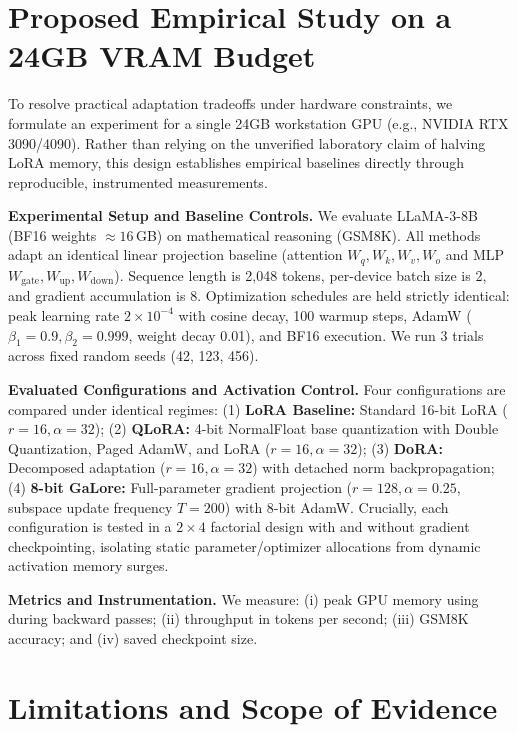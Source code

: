 \documentclass[11pt,a4paper]{article}
\begin{document}
\section{Proposed Empirical Study on a 24GB VRAM Budget}

To resolve practical adaptation tradeoffs under hardware constraints, we formulate an experiment for a single 24GB workstation GPU (e.g., NVIDIA RTX 3090/4090). Rather than relying on the unverified laboratory claim of halving LoRA memory, this design establishes empirical baselines directly through reproducible, instrumented measurements.

\textbf{Experimental Setup and Baseline Controls.} We evaluate LLaMA-3-8B (BF16 weights $\approx 16$\,GB) on mathematical reasoning (GSM8K). All methods adapt an identical linear projection baseline (attention $W_q, W_k, W_v, W_o$ and MLP $W_{\text{gate}}, W_{\text{up}}, W_{\text{down}}$). Sequence length is 2,048 tokens, per-device batch size is 2, and gradient accumulation is 8. Optimization schedules are held strictly identical: peak learning rate $2 \times 10^{-4}$ with cosine decay, 100 warmup steps, AdamW ($\beta_1=0.9, \beta_2=0.999$, weight decay 0.01), and BF16 execution. We run 3 trials across fixed random seeds (42, 123, 456).

\textbf{Evaluated Configurations and Activation Control.} Four configurations are compared under identical regimes: (1) \textbf{LoRA Baseline:} Standard 16-bit LoRA ($r=16, \alpha=32$); (2) \textbf{QLoRA:} 4-bit NormalFloat base quantization with Double Quantization, Paged AdamW, and LoRA ($r=16, \alpha=32$); (3) \textbf{DoRA:} Decomposed adaptation ($r=16, \alpha=32$) with detached norm backpropagation; (4) \textbf{8-bit GaLore:} Full-parameter gradient projection ($r=128, \alpha=0.25$, subspace update frequency $T=200$) with 8-bit AdamW. Crucially, each configuration is tested in a $2 \times 4$ factorial design with and without gradient checkpointing, isolating static parameter/optimizer allocations from dynamic activation memory surges.

\textbf{Metrics and Instrumentation.} We measure: (i) peak GPU memory using  during backward passes; (ii) throughput in tokens per second; (iii) GSM8K accuracy; and (iv) saved checkpoint size.

\section{Limitations and Scope of Evidence}
\end{document}

